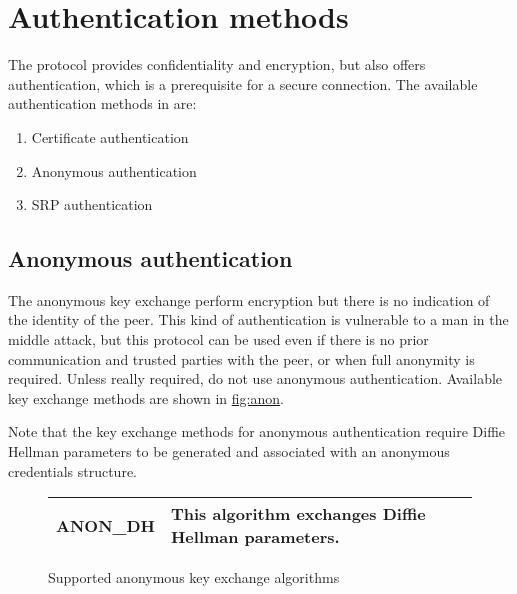 \chapter{Authentication methods}

The \tls{} protocol provides confidentiality and encryption, but
also offers authentication, which is a prerequisite
for a secure connection. 
The available authentication methods in \gnutls{} are:
\begin{enumerate}
 \item Certificate authentication
 \item Anonymous authentication
 \item SRP authentication
\end{enumerate}



\section{Anonymous authentication}
The anonymous key exchange perform encryption but there is no indication of 
the identity of the peer. This kind of authentication is vulnerable to a
man in the middle attack, 
but this protocol can be used even if there is no prior communication and
trusted parties with the peer, or when full anonymity is required.
Unless really required, do not use anonymous authentication.
Available key exchange methods are shown in \hyperref{figure}{figure }{}{fig:anon}.
\par
Note that the key exchange methods for anonymous authentication
require Diffie Hellman parameters to be generated and associated with an
anonymous credentials structure. 

\begin{figure}[hbtp]
\begin{tabular}{|l|p{9cm}|}

\hline
ANON\_DH & This algorithm exchanges Diffie Hellman parameters. 
\\
\hline
\end{tabular}

\caption{Supported anonymous key exchange algorithms}
\label{fig:anon}

\end{figure}


